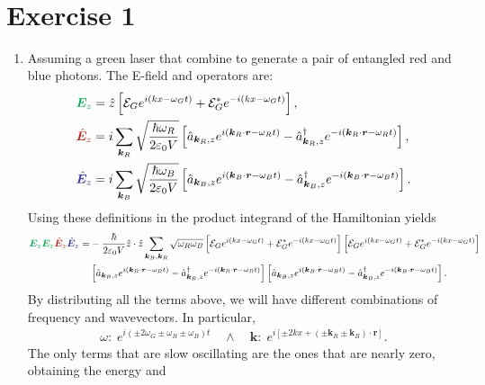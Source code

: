 \documentclass[letterpaper,11pt,twoside]{article}
\title{\textbf{\assignment}\\\course\\{\Large\institution}}
\author{\autor}
\newcommand{\bE}{\bm{E}}
\newcommand{\E}{\mathcal{E}}
\newcommand{\br}{\bm{r}}
\newcommand{\bk}{\bm{k}}
\newcommand{\ha}{\hat{a}}
\newcommand{\hbE}{\hat{\bm{E}}}
\newcommand{\hz}{\hat{z}}
\begin{document}
\pagestyle{mainstyle}
\maketitle
\section*{Exercise 1}
\begin{enumerate}[itemsep=0pt,topsep=0pt,parsep=0pt,label=\alph*)]
  \item Assuming a green laser that combine to generate a pair of entangled red and blue photons. 
  The E-field and operators are:
  \begin{align*}
    \textcolor{Green}{\bE_z}&=\hz\left[\E_Ge^{i(kx-\omega_Gt)}+\E_G^*e^{-i(kx-\omega_Gt)}\right],\\
    \textcolor{BrickRed}{\hbE_z}&=i\sum_{\bk_R}\sqrt{\frac{\hbar\omega_R}{2\varepsilon_0V}}\left[\ha_{\bk_R,z}e^{i(\bk_R\cdot\br-\omega_Rt)}-\ha^\dagger_{\bk_R,z}e^{-i(\bk_R\cdot\br-\omega_R t)}\right],\\
    \textcolor{Blue}{\hbE_z}&=i\sum_{\bk_B}\sqrt{\frac{\hbar\omega_B}{2\varepsilon_0V}}\left[\ha_{\bk_B,z}e^{i(\bk_B\cdot\br-\omega_Bt)}-\ha^\dagger_{\bk_B,z}e^{-i(\bk_B\cdot\br-\omega_Bt)}\right].
  \end{align*}
  Using these definitions in the product integrand of the Hamiltonian yields
  {\small
  \begin{align*}
    \textcolor{Green}{\bE_z}\textcolor{Green}{\bE_z}\textcolor{BrickRed}{\hbE_z}
    \textcolor{Blue}{\hbE_z}=&-\frac{\hbar}{2\varepsilon_0V}\hz\cdot\hz\sum_{\bk_B,\bk_R}\sqrt{\omega_R\omega_B}\left[\E_Ge^{i(kx-\omega_Gt)}+\E_G^*e^{-i(kx-\omega_Gt)}\right]\left[\E_Ge^{i(kx-\omega_Gt)}+\E_G^*e^{-i(kx-\omega_Gt)}\right]\\
    &\left[\ha_{\bk_R,z}e^{i(\bk_R\cdot\br-\omega_Rt)}-\ha^\dagger_{\bk_R,z}e^{-i(\bk_R\cdot\br-\omega_R t)}\right]
    \left[\ha_{\bk_B,z}e^{i(\bk_B\cdot\br-\omega_Bt)}-\ha^\dagger_{\bk_B,z}e^{-i(\bk_B\cdot\br-\omega_Bt)}\right].
  \end{align*}}
  By distributing all the terms above, we will have different combinations of frequency and wavevectors.
  In particular,
  \begin{align*}
    \omega:\;e^{i(\pm 2\omega_G\pm\omega_R\pm\omega_B)t}\quad\land\quad\bk:\;e^{i[\pm2kx+(\pm\bk_R\pm\bk_B)\cdot\br]}.
  \end{align*}
  The only terms that are slow oscillating are the ones that are nearly zero, obtaining the energy and 

\end{enumerate}
\end{document}

